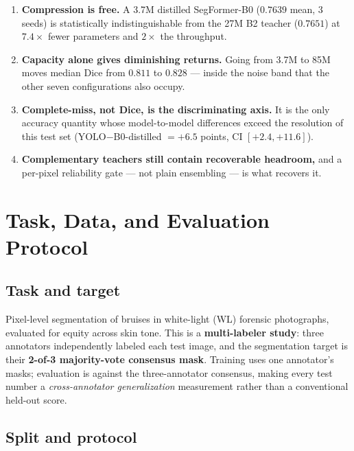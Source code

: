 \documentclass[11pt]{article}
\begin{document}
\begin{enumerate}[leftmargin=1.6em,itemsep=3pt]
  \item \textbf{Compression is free.} A 3.7M distilled SegFormer-B0 ($0.7639$ mean, 3 seeds) is
  statistically indistinguishable from the 27M B2 teacher ($0.7651$) at $7.4\times$ fewer
  parameters and $2\times$ the throughput.
  \item \textbf{Capacity alone gives diminishing returns.} Going from 3.7M to 85M moves median
  Dice from $0.811$ to $0.828$ --- inside the noise band that the other seven configurations
  also occupy.
  \item \textbf{Complete-miss, not Dice, is the discriminating axis.} It is the only accuracy
  quantity whose model-to-model differences exceed the resolution of this test set
  (YOLO$-$B0-distilled $=+6.5$ points, CI $[+2.4,+11.6]$).
  \item \textbf{Complementary teachers still contain recoverable headroom,} and a per-pixel
  reliability gate --- not plain ensembling --- is what recovers it.
\end{enumerate}

\section{Task, Data, and Evaluation Protocol}

\subsection{Task and target}
Pixel-level segmentation of bruises in white-light (WL) forensic photographs, evaluated for equity
across skin tone. This is a \textbf{multi-labeler study}: three annotators independently labeled
each test image, and the segmentation target is their \textbf{2-of-3 majority-vote consensus mask}.
Training uses one annotator's masks; evaluation is against the three-annotator consensus, making
every test number a \emph{cross-annotator generalization} measurement rather than a conventional
held-out score.

\subsection{Split and protocol}
\end{document}
